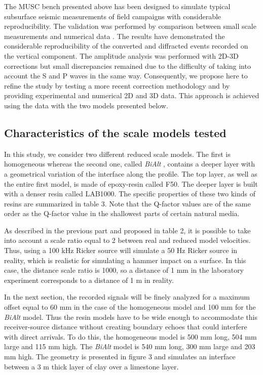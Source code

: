 \documentclass[paper,extra]{gji} %
\newcommand{\bialt}{\textit{BiAlt} }
\begin{document}
\noindent The MUSC bench presented above has been designed to simulate typical subsurface seismic measurements of field campaigns with considerable reproducibility. The validation was performed by comparison between small scale measurements and numerical data \citep{Bretaudeau_SSM_2011}. The results have demonstrated the considerable reproducibility of the converted and diffracted events recorded on the vertical component. The amplitude analysis was performed with 2D-3D corrections but small discrepancies remained due to the difficulty of taking into account the S and P waves in the same way. Consequently, we propose here to refine the study by testing a more recent correction methodology \citet{Schafer_LSS_2014} and by providing experimental and numerical 2D and 3D data. This approach is achieved using the data with the two models presented below.


\subsection{Characteristics of the scale models tested}

\noindent In this study, we consider two different reduced scale models. The first is homogeneous whereas the second one, called \bialt, contains a deeper layer with a geometrical variation of the interface along the profile. The top layer, as well as the entire first model, is made of epoxy-resin called F50. The deeper layer is built with a denser resin called LAB1000. The specific properties of these two kinds of resins are summarized in table 3. Note that the Q-factor values are of the same order as the Q-factor value in the shallowest parts of certain natural media.

\noindent As described in the previous part and proposed in table 2, it is possible to take into account a scale ratio equal to 2 between real and reduced model velocities. Thus, using a 100 kHz Ricker source will simulate a 50 Hz Ricker source in reality, which is realistic for simulating a hammer impact on a surface. In this case, the distance scale ratio is 1000, so a distance of 1 mm in the laboratory experiment corresponds to a distance of 1 m in reality. 

\noindent In the next section, the recorded signals will be finely analyzed for a maximum offset equal to 60 mm in the case of the homogeneous model and 100 mm for the \bialt model. Thus the resin models have to be wide enough to accommodate this receiver-source distance without creating boundary echoes that could interfere with direct arrivals. To do this, the homogeneous model is 500 mm long, 504 mm large and 115 mm high. The \bialt model is 540 mm long, 300 mm large and 203 mm high. The geometry is presented in figure 3 and simulates an interface between a 3 m thick layer of clay over a limestone layer.
\end{document}
